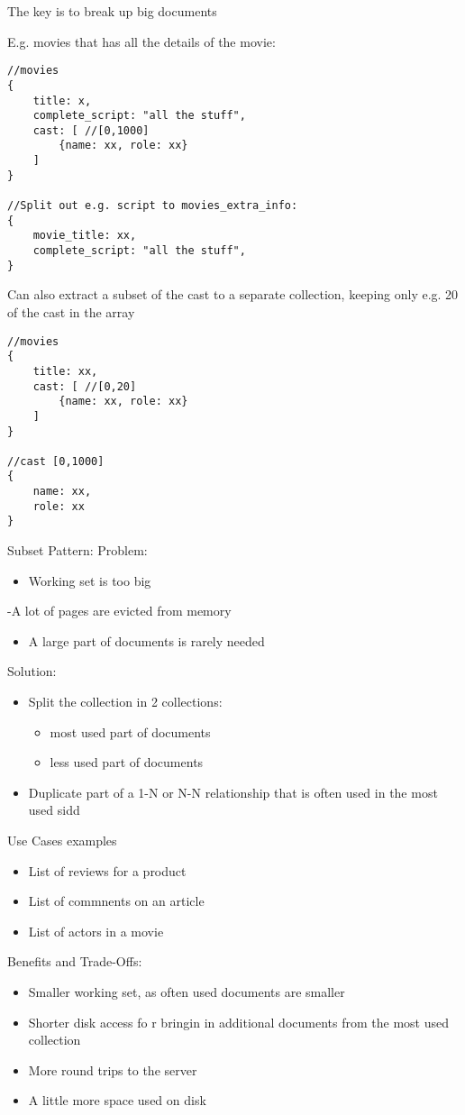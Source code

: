 \documentclass[11pt]{article}
\begin{document}
\begin{enumerate}
The key is to break up big documents

E.g. movies that has all the details of the movie:
\begin{verbatim}
//movies
{
    title: x,
    complete_script: "all the stuff",
    cast: [ //[0,1000]
        {name: xx, role: xx}
    ]
}

//Split out e.g. script to movies_extra_info:
{
    movie_title: xx,
    complete_script: "all the stuff",
}
\end{verbatim}

Can also extract a subset of the cast to a separate collection, keeping only e.g. 20 of the cast in the array
\begin{verbatim}
//movies
{
    title: xx,
    cast: [ //[0,20]
        {name: xx, role: xx}
    ]
}

//cast [0,1000]
{
    name: xx,
    role: xx
}
\end{verbatim}

Subset Pattern:
Problem:
\begin{itemize}
\item Working set is too big
\end{itemize}
-A lot of pages are evicted from memory
\begin{itemize}
\item A large part of documents is rarely needed
\end{itemize}

Solution:
\begin{itemize}
\item Split the collection in 2 collections:
\begin{itemize}
\item most used part of documents
\item less used part of documents
\end{itemize}
\item Duplicate part of a 1-N or N-N relationship that is often used in the most used sidd
\end{itemize}

Use Cases examples
\begin{itemize}
\item List of reviews for a product
\item List of commnents on an article
\item List of actors in a movie
\end{itemize}

Benefits and Trade-Offs:
\begin{itemize}
\item Smaller working set, as often used documents are smaller
\item Shorter disk access fo r bringin in additional documents from the most used collection
\item More round trips to the server
\item A little more space used on disk
\end{itemize}


\end{enumerate}
\end{document}
